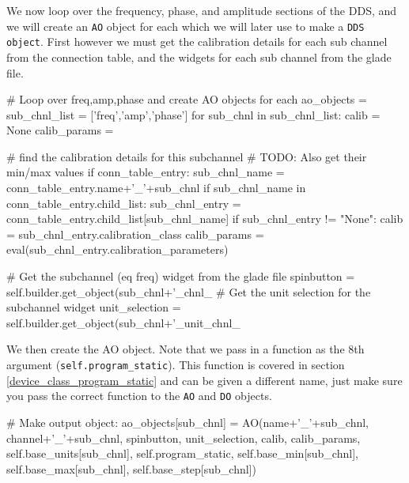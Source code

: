\documentclass[12pt]{article}
\begin{document}
We now loop over the frequency, phase, and amplitude sections of the DDS, and we will create an \texttt{AO} object for each which we will later use to make a \texttt{DDS object}. First however we must get the calibration details for each sub channel from the connection table, and the widgets for each sub channel from the glade file.
\begin{python}
            # Loop over freq,amp,phase and create AO objects for each
            ao_objects = {}
            sub_chnl_list = ['freq','amp','phase']
            for sub_chnl in sub_chnl_list:
                calib = None
                calib_params = {}
                
                # find the calibration details for this subchannel
                # TODO: Also get their min/max values
                if conn_table_entry:
                	sub_chnl_name = conn_table_entry.name+'_'+sub_chnl
                    if sub_chnl_name in conn_table_entry.child_list:
                        sub_chnl_entry = conn_table_entry.child_list[sub_chnl_name]
                        if sub_chnl_entry != "None":
                            calib = sub_chnl_entry.calibration_class
                            calib_params =
                                eval(sub_chnl_entry.calibration_parameters)
                
                # Get the subchannel (eq freq) widget from the glade file
                spinbutton = self.builder.get_object(sub_chnl+'_chnl_%
                # Get the unit selection for the subchannel widget
                unit_selection = self.builder.get_object(sub_chnl+'_unit_chnl_%
\end{python}

We then create the AO object. Note that we pass in a function as the 8th argument (\texttt{self.program\_static}). This function is covered in section \ref{device_class_program_static} and can be given a different name, just make sure you pass the correct function to the \texttt{AO} and \texttt{DO} objects.
\begin{python}
                # Make output object:
                ao_objects[sub_chnl] = AO(name+'_'+sub_chnl, 
                                          channel+'_'+sub_chnl, 
                                          spinbutton, 
                                          unit_selection, 
                                          calib, 
                                          calib_params, 
                                          self.base_units[sub_chnl], 
                                          self.program_static, 
                                          self.base_min[sub_chnl], 
                                          self.base_max[sub_chnl], 
                                          self.base_step[sub_chnl])
\end{python}
\end{document}

